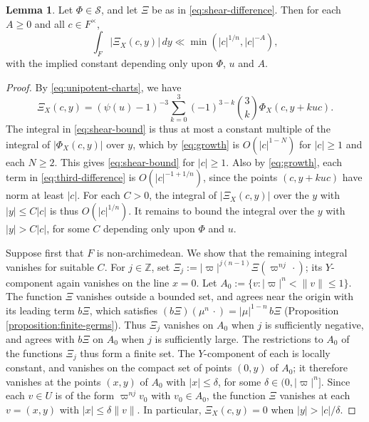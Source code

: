 \documentclass[reqno]{amsart}
\theoremstyle{plain}
\theoremstyle{definition}
\theoremstyle{itplain}
\newtheorem{lemma}[theorem]{Lemma}
\numberwithin{equation}{section}
\numberwithin{theorem}{section}
\begin{document}
\begin{lemma}\label{lemma:shear-integrable}
  Let $\Phi \in \mathcal{S}$, and let $\Xi$ be as in \eqref{eq:shear-difference}.  Then for each $A \geq 0$ and all $c \in F^\times$,
  \begin{equation}\label{eq:shear-bound}
    \int_F \lvert \Xi_X(c, y) \rvert \, d y
    \ll \min \left( \lvert c \rvert^{1/n}, \lvert c \rvert^{-A} \right),
  \end{equation}
  with the implied constant depending only upon $\Phi$, $u$ and $A$.
\end{lemma}
\begin{proof}
  By \eqref{eq:unipotent-charts}, we have
  \begin{equation}\label{eq:third-difference}
    \Xi_X(c, y) = (\psi(u) - 1)^{-3} \sum_{k = 0}^{3} (-1)^{3 - k} \binom{3}{k} \Phi_X(c, y + k u c).
  \end{equation}
  The integral in \eqref{eq:shear-bound} is thus at most a constant multiple of the integral of $\lvert \Phi_X(c, y) \rvert$ over $y$, which by \eqref{eq:growth} is $O(\lvert c \rvert^{1 - N})$ for $\lvert c \rvert \geq 1$ and each $N \geq 2$.  This gives \eqref{eq:shear-bound} for $\lvert c \rvert \geq 1$.  Also by \eqref{eq:growth}, each term in \eqref{eq:third-difference} is $O(\lvert c \rvert^{-1 + 1/n})$, since the points $(c, y + k u c)$ have norm at least $\lvert c \rvert$.  For each $C > 0$, the integral of $\lvert \Xi_X(c, y) \rvert$ over the $y$ with $\lvert y \rvert \leq C \lvert c \rvert$ is thus $O(\lvert c \rvert^{1/n})$.  It remains to bound the integral over the $y$ with $\lvert y \rvert > C \lvert c \rvert$, for some $C$ depending only upon $\Phi$ and $u$.

  Suppose first that $F$ is non-archimedean.  We show that the remaining integral vanishes for suitable $C$.  For $j \in \mathbb{Z}$, set $\Xi_j := \lvert \varpi \rvert^{j (n-1)} \Xi(\varpi^{n j} \, \cdot)$; its $Y$-component again vanishes on the line $x = 0$.  Let $A_0 := \{v : \lvert \varpi \rvert^n < \lVert v \rVert \leq 1\}$.  The function $\Xi$ vanishes outside a bounded set, and agrees near the origin with its leading term $b \Xi$, which satisfies $(b \Xi)(\mu^n \, \cdot) = \lvert \mu \rvert^{1-n} \, b \Xi$ (Proposition \ref{proposition:finite-germs}).  Thus $\Xi_j$ vanishes on $A_0$ when $j$ is sufficiently negative, and agrees with $b \Xi$ on $A_0$ when $j$ is sufficiently large.  The restrictions to $A_0$ of the functions $\Xi_j$ thus form a finite set.  The $Y$-component of each is locally constant, and vanishes on the compact set of points $(0, y)$ of $A_0$; it therefore vanishes at the points $(x, y)$ of $A_0$ with $\lvert x \rvert \leq \delta$, for some $\delta \in (0, \lvert \varpi \rvert^n]$.  Since each $v \in U$ is of the form $\varpi^{n j} v_0$ with $v_0 \in A_0$, the function $\Xi$ vanishes at each $v = (x, y)$ with $\lvert x \rvert \leq \delta \lVert v \rVert$.  In particular, $\Xi_X(c, y) = 0$ when $\lvert y \rvert > \lvert c \rvert / \delta$.


\end{proof}
\end{document}
